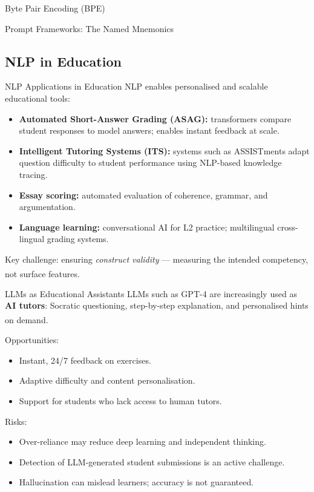 \begin{v3topic}{Byte Pair Encoding (BPE)}
\begin{v3topic}{Prompt Frameworks: The Named Mnemonics}
\subsection{NLP in Education}


\begin{v3topic}{NLP Applications in Education}
    NLP enables personalised and scalable educational tools:
    \begin{itemize}
        \item \textbf{Automated Short-Answer Grading (ASAG):} transformers compare
              student responses to model answers; enables instant feedback at scale.
        \item \textbf{Intelligent Tutoring Systems (ITS):} systems such as ASSISTments
              adapt question difficulty to student performance using NLP-based knowledge
              tracing.
        \item \textbf{Essay scoring:} automated evaluation of coherence, grammar, and
              argumentation.
        \item \textbf{Language learning:} conversational AI for L2 practice;
              multilingual cross-lingual grading systems.
    \end{itemize}
    Key challenge: ensuring \emph{construct validity} --- measuring the intended
    competency, not surface
    features.\textsuperscript{\cite[][p.~11]{dhamaniIntroductionGenerativeAI2024}}

\end{v3topic}
\begin{v3topic}{LLMs as Educational Assistants}
    LLMs such as GPT-4 are increasingly used as \textbf{AI tutors}: Socratic
    questioning, step-by-step explanation, and personalised hints on
    demand.\textsuperscript{\cite[][p.~2]{farrisHowLargeLanguage2025}}

    Opportunities:
    \begin{itemize}
        \item Instant, 24/7 feedback on exercises.
        \item Adaptive difficulty and content personalisation.
        \item Support for students who lack access to human tutors.
    \end{itemize}

    Risks:
    \begin{itemize}
        \item Over-reliance may reduce deep learning and independent thinking.
        \item Detection of LLM-generated student submissions is an active challenge.
        \item Hallucination can mislead learners; accuracy is not guaranteed.
    \end{itemize}


\end{v3topic}
\end{v3topic}
\end{v3topic}
